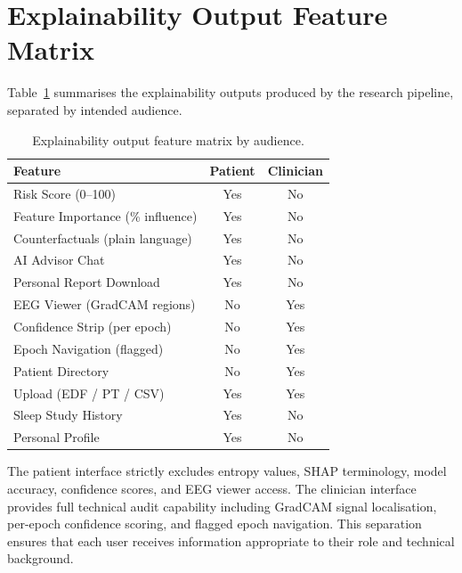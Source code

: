 \section{Explainability Output Feature Matrix}

Table~\ref{tab:platform} summarises the explainability outputs produced by the research pipeline, separated by intended audience.

\begin{table}[h]
\centering
\caption{Explainability output feature matrix by audience.}
\label{tab:platform}
\begin{tabular}{p{4.5cm}cc}
\toprule
Feature & Patient & Clinician \\
\midrule
Risk Score (0--100) & Yes & No \\
Feature Importance (\% influence) & Yes & No \\
Counterfactuals (plain language) & Yes & No \\
AI Advisor Chat & Yes & No \\
Personal Report Download & Yes & No \\
EEG Viewer (GradCAM regions) & No & Yes \\
Confidence Strip (per epoch) & No & Yes \\
Epoch Navigation (flagged) & No & Yes \\
Patient Directory & No & Yes \\
Upload (EDF / PT / CSV) & Yes & Yes \\
Sleep Study History & Yes & No \\
Personal Profile & Yes & No \\
\bottomrule
\end{tabular}
\end{table}

The patient interface strictly excludes entropy values, SHAP terminology, model accuracy, confidence scores, and EEG viewer access. The clinician interface provides full technical audit capability including GradCAM signal localisation, per-epoch confidence scoring, and flagged epoch navigation. This separation ensures that each user receives information appropriate to their role and technical background.
